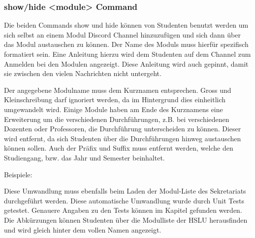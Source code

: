 \documentclass[a4paper, table]{article}
\begin{document}
\subsubsection{show/hide <module> Command}

Die beiden Commands show und hide können von Studenten benutzt werden um sich selbst an einem Modul Discord Channel hinzuzufügen und sich dann über das Modul austauschen zu können.
Der Name des Moduls muss hierfür spezifisch formatiert sein.
Eine Anleitung hierzu wird dem Studenten auf dem Channel zum Anmelden bei den Modulen angezeigt.
Diese Anleitung wird auch gepinnt, damit sie zwischen den vielen Nachrichten nicht untergeht.

Der angegebene Modulname muss dem Kurznamen entsprechen.
Gross und Kleinschreibung darf ignoriert werden, da im Hintergrund dies einheitlich umgewandelt wird.
Einige Module haben am Ende des Kurznamens eine Erweiterung um die verschiedenen Durchführungen, \gls{z.B.} bei verschiedenen Dozenten oder Professoren, die Durchführung unterscheiden zu können.
Dieser wird entfernt, da sich Studenten über die Durchführungen hinweg austauschen können sollen.
Auch der Präfix und Suffix muss entfernt werden, welche den Studiengang, \gls{bzw.} das Jahr und Semester beinhaltet.

Beispiele:


Diese Umwandlung muss ebenfalls beim Laden der Modul-Liste des Sekretariats durchgeführt werden.
Diese automatische Umwandlung wurde durch Unit Tests getestet.
Genauere Angaben zu den Tests können im Kapitel  gefunden werden.
Die Abkürzungen können Studenten über die Modulliste der HSLU herausfinden und wird gleich hinter dem vollen Namen angezeigt.\autocite{noauthor_bachelor_nodate}
\end{document}
